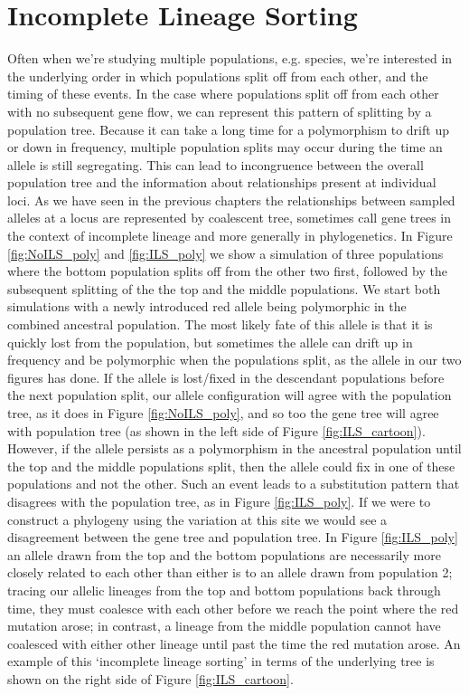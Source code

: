 \section{Incomplete Lineage Sorting}
Often when we're studying multiple populations, e.g. species, we're interested in the
underlying order in which populations split off from each other, and
the timing of these events. In the case where populations split off
from each other with no subsequent gene flow, we can represent this
pattern of splitting by a population tree. Because it can take a long time for a polymorphism to drift up or down in frequency, multiple population splits may occur during the time an allele is still segregating. This can lead to incongruence between the overall population tree and the information about relationships present at
individual loci. 
As we have seen in the previous chapters the
relationships between sampled alleles at a locus are represented by
coalescent tree, sometimes call gene trees in the context of
incomplete lineage and more generally in phylogenetics.
In Figure \ref{fig:NoILS_poly} and \ref{fig:ILS_poly}
we show a simulation of three populations where the bottom population splits off from the other two first, followed by the subsequent splitting of the the top and the middle populations. We start both simulations with a newly
introduced red allele being polymorphic in the combined ancestral population. The most likely fate of this allele is that it is
quickly lost from the population, but sometimes the allele can drift up in frequency and be polymorphic when the populations split, as the allele in our two figures has done. If the allele is lost/fixed in the descendant populations before the next population split, our allele
configuration will agree with the population tree, as it does in
Figure  \ref{fig:NoILS_poly}, and so too the gene tree will agree with population tree (as shown in the left side of Figure \ref{fig:ILS_cartoon}).
However, if the allele persists as a polymorphism in the ancestral population until the top and the middle
populations split, then the allele could fix in one of these populations
and not the other. Such an event leads to a substitution pattern
that disagrees with the population tree, as in Figure \ref{fig:ILS_poly}.  If
we were to construct a phylogeny using the variation at this site we would see a disagreement between the gene tree and population tree. In Figure \ref{fig:ILS_poly} an allele
drawn from the top and the bottom populations are
necessarily more closely related to each other than either is to an allele drawn from population 2;
tracing our allelic lineages from the top and bottom populations back through time, they must coalesce with each other before we reach the point where the red mutation arose; in contrast, a lineage from the middle population cannot have coalesced with either other lineage until past the time the red mutation arose. An example of this `incomplete lineage sorting' in terms of the underlying tree is shown on the right side of Figure \ref{fig:ILS_cartoon}.


